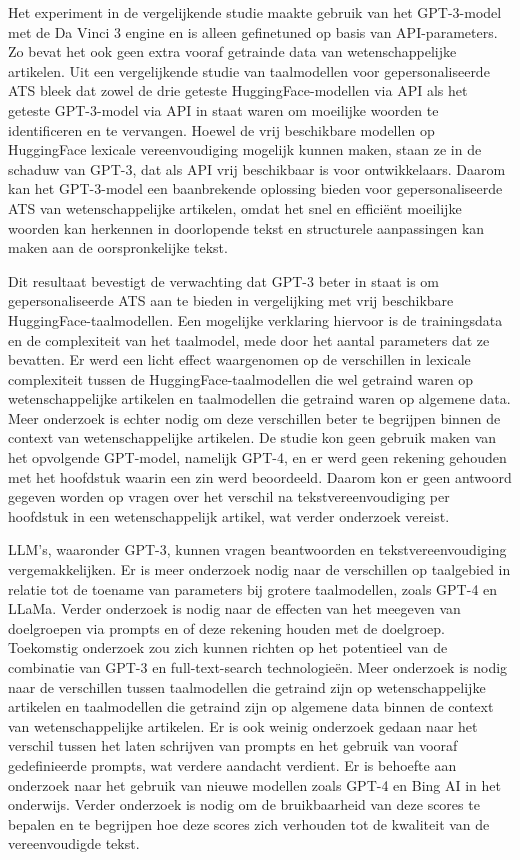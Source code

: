 \medspace

Het experiment in de vergelijkende studie maakte gebruik van het GPT-3-model met de Da Vinci 3 engine en is alleen gefinetuned op basis van API-parameters. Zo bevat het ook geen extra vooraf getrainde data van wetenschappelijke artikelen. Uit een vergelijkende studie van taalmodellen voor gepersonaliseerde ATS bleek dat zowel de drie geteste HuggingFace-modellen via API als het geteste GPT-3-model via API in staat waren om moeilijke woorden te identificeren en te vervangen. Hoewel de vrij beschikbare modellen op HuggingFace lexicale vereenvoudiging mogelijk kunnen maken, staan ze in de schaduw van GPT-3, dat als API vrij beschikbaar is voor ontwikkelaars. Daarom kan het GPT-3-model een baanbrekende oplossing bieden voor gepersonaliseerde ATS van wetenschappelijke artikelen, omdat het snel en efficiënt moeilijke woorden kan herkennen in doorlopende tekst en structurele aanpassingen kan maken aan de oorspronkelijke tekst.

Dit resultaat bevestigt de verwachting dat GPT-3 beter in staat is om gepersonaliseerde ATS aan te bieden in vergelijking met vrij beschikbare HuggingFace-taalmodellen. Een mogelijke verklaring hiervoor is de trainingsdata en de complexiteit van het taalmodel, mede door het aantal parameters dat ze bevatten. Er werd een licht effect waargenomen op de verschillen in lexicale complexiteit tussen de HuggingFace-taalmodellen die wel getraind waren op wetenschappelijke artikelen en taalmodellen die getraind waren op algemene data. Meer onderzoek is echter nodig om deze verschillen beter te begrijpen binnen de context van wetenschappelijke artikelen. De studie kon geen gebruik maken van het opvolgende GPT-model, namelijk GPT-4, en er werd geen rekening gehouden met het hoofdstuk waarin een zin werd beoordeeld. Daarom kon er geen antwoord gegeven worden op vragen over het verschil na tekstvereenvoudiging per hoofdstuk in een wetenschappelijk artikel, wat verder onderzoek vereist.

LLM's, waaronder GPT-3, kunnen vragen beantwoorden en tekstvereenvoudiging vergemakkelijken. Er is meer onderzoek nodig naar de verschillen op taalgebied in relatie tot de toename van parameters bij grotere taalmodellen, zoals GPT-4 en LLaMa. Verder onderzoek is nodig naar de effecten van het meegeven van doelgroepen via prompts en of deze rekening houden met de doelgroep. Toekomstig onderzoek zou zich kunnen richten op het potentieel van de combinatie van GPT-3 en full-text-search technologieën. Meer onderzoek is nodig naar de verschillen tussen taalmodellen die getraind zijn op wetenschappelijke artikelen en taalmodellen die getraind zijn op algemene data binnen de context van wetenschappelijke artikelen. Er is ook weinig onderzoek gedaan naar het verschil tussen het laten schrijven van prompts en het gebruik van vooraf gedefinieerde prompts, wat verdere aandacht verdient. Er is behoefte aan onderzoek naar het gebruik van nieuwe modellen zoals GPT-4 en Bing AI in het onderwijs. Verder onderzoek is nodig om de bruikbaarheid van deze scores te bepalen en te begrijpen hoe deze scores zich verhouden tot de kwaliteit van de vereenvoudigde tekst.

